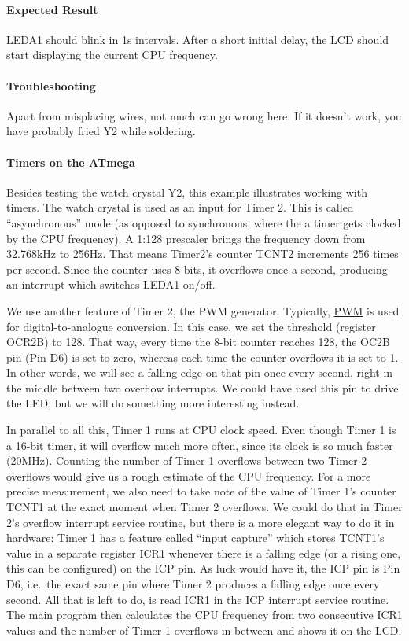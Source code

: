 \documentclass{article}
\begin{document}
\paragraph{Expected Result}
LEDA1 should blink in 1s intervals. After a short initial delay, the LCD should start displaying the current CPU frequency. 

\paragraph{Troubleshooting}
Apart from misplacing wires, not much can go wrong here. If it doesn't work, you have probably fried Y2 while soldering. 

\paragraph{Timers on the ATmega}
Besides testing the watch crystal Y2, this example illustrates working with timers. 
The watch crystal is used as an input for Timer 2. This is called ``asynchronous'' mode (as opposed to synchronous, where the a timer gets clocked by the CPU frequency). A 1:128 prescaler brings the frequency down from 32.768kHz to 256Hz. That means Timer2's counter TCNT2 increments 256 times per second. Since the counter uses 8 bits, it overflows once a second, producing an interrupt which switches LEDA1 on/off. 

We use another feature of Timer 2, the PWM generator. Typically, \href{https://en.wikipedia.org/wiki/Pulse-width_modulation}{PWM} is used for digital-to-analogue conversion. In this case, we set the threshold (register OCR2B) to 128. That way, every time the 8-bit counter reaches 128, the OC2B pin (Pin D6) is set to zero, whereas each time the counter overflows it is set to 1. In other words, we will see a falling edge on that pin once every second, right in the middle between two overflow interrupts. We could have used this pin to drive the LED, but we will do something more interesting instead. 

In parallel to all this, Timer 1 runs at CPU clock speed. Even though Timer 1 is a 16-bit timer, it will overflow much more often, since its clock is so much faster (20MHz). Counting the number of Timer 1 overflows between two Timer 2 overflows would give us a rough estimate of the CPU frequency. For a more precise measurement, we also need to take note of the value of Timer 1's counter TCNT1 at the exact moment when Timer 2 overflows. We could do that in Timer 2's overflow interrupt service routine, but there is a more elegant way to do it in hardware: Timer 1 has a feature called ``input capture'' which stores TCNT1's value in a separate register ICR1 whenever there is a falling edge (or a rising one, this can be configured) on the ICP pin. As luck would have it, the ICP pin is Pin D6, i.e.\ the exact same pin where Timer 2 produces a falling edge once every second. All that is left to do, is read ICR1 in the ICP interrupt service routine. The main program then calculates the CPU frequency from two consecutive ICR1 values and the number of Timer 1 overflows in between and shows it on the LCD. 
\end{document}

